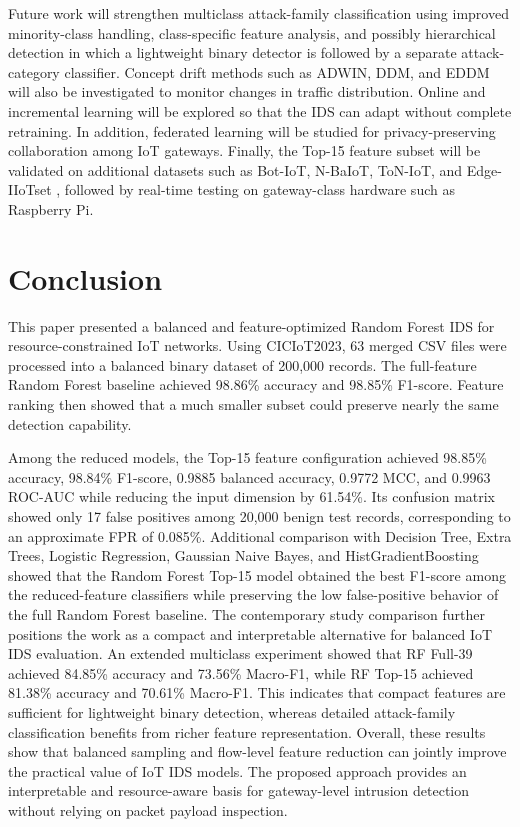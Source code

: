 \documentclass[journal]{IEEEtran}
\begin{document}
Future work will strengthen multiclass attack-family classification using improved minority-class handling, class-specific feature analysis, and possibly hierarchical detection in which a lightweight binary detector is followed by a separate attack-category classifier. Concept drift methods such as ADWIN, DDM, and EDDM will also be investigated to monitor changes in traffic distribution. Online and incremental learning will be explored so that the IDS can adapt without complete retraining. In addition, federated learning will be studied for privacy-preserving collaboration among IoT gateways. Finally, the Top-15 feature subset will be validated on additional datasets such as Bot-IoT, N-BaIoT, ToN-IoT, and Edge-IIoTset \cite{koroniotis2019botiot,meidan2018nbaiot,moustafa2020toniot,ferrag2022edgeiiotset}, followed by real-time testing on gateway-class hardware such as Raspberry Pi.

\section{Conclusion}
\label{sec:conclusion}

This paper presented a balanced and feature-optimized Random Forest IDS for resource-constrained IoT networks. Using CICIoT2023, 63 merged CSV files were processed into a balanced binary dataset of 200,000 records. The full-feature Random Forest baseline achieved 98.86\% accuracy and 98.85\% F1-score. Feature ranking then showed that a much smaller subset could preserve nearly the same detection capability.

Among the reduced models, the Top-15 feature configuration achieved 98.85\% accuracy, 98.84\% F1-score, 0.9885 balanced accuracy, 0.9772 MCC, and 0.9963 ROC-AUC while reducing the input dimension by 61.54\%. Its confusion matrix showed only 17 false positives among 20,000 benign test records, corresponding to an approximate FPR of 0.085\%. Additional comparison with Decision Tree, Extra Trees, Logistic Regression, Gaussian Naive Bayes, and HistGradientBoosting showed that the Random Forest Top-15 model obtained the best F1-score among the reduced-feature classifiers while preserving the low false-positive behavior of the full Random Forest baseline. The contemporary study comparison further positions the work as a compact and interpretable alternative for balanced IoT IDS evaluation. An extended multiclass experiment showed that RF Full-39 achieved 84.85\% accuracy and 73.56\% Macro-F1, while RF Top-15 achieved 81.38\% accuracy and 70.61\% Macro-F1. This indicates that compact features are sufficient for lightweight binary detection, whereas detailed attack-family classification benefits from richer feature representation. Overall, these results show that balanced sampling and flow-level feature reduction can jointly improve the practical value of IoT IDS models. The proposed approach provides an interpretable and resource-aware basis for gateway-level intrusion detection without relying on packet payload inspection.
\end{document}
